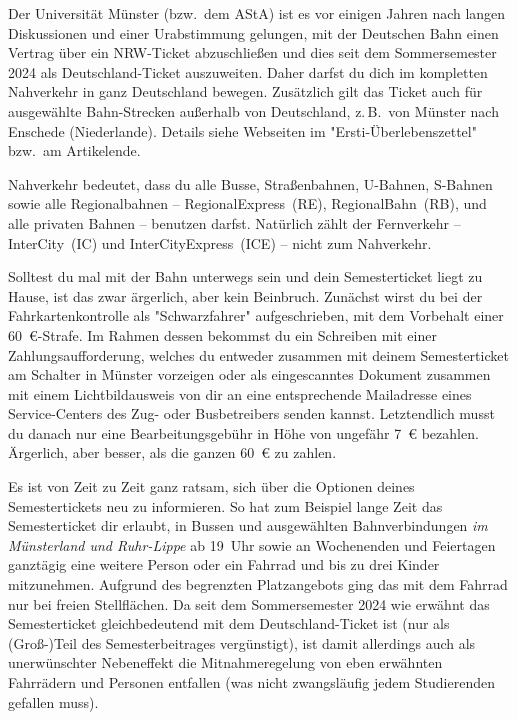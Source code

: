 \begin{multicols*}{2}
Der Universität Münster (bzw.\ dem AStA) ist es vor einigen Jahren nach langen Diskussionen und einer Urabstimmung gelungen, mit der Deutschen Bahn einen Vertrag über ein NRW-Ticket abzuschließen und dies seit dem Sommersemester 2024 als Deutschland-Ticket auszuweiten.
Daher darfst du dich im kompletten Nahverkehr in ganz Deutschland bewegen.
Zusätzlich gilt das Ticket auch für ausgewählte Bahn-Strecken außerhalb von Deutschland, z.\,B.\ von Münster nach Enschede (Niederlande). Details siehe Webseiten im "Ersti-Überlebenszettel" bzw.\ am Artikelende.

Nahverkehr bedeutet, dass du alle Busse, Straßenbahnen, U-Bahnen, S-Bahnen sowie alle Regionalbahnen -- RegionalExpress~(RE), RegionalBahn~(RB), und alle privaten Bahnen -- benutzen darfst.
Natürlich zählt der Fernverkehr -- InterCity~(IC) und InterCityExpress~(ICE) -- nicht zum Nahverkehr.

Solltest du mal mit der Bahn unterwegs sein und dein Semesterticket liegt zu Hause, ist das zwar ärgerlich, aber kein Beinbruch.
Zunächst wirst du bei der Fahrkartenkontrolle als "Schwarzfahrer" aufgeschrieben, mit dem Vorbehalt einer \SI{60}{\euro}-Strafe.
Im Rahmen dessen bekommst du ein Schreiben mit einer Zahlungsaufforderung, welches du entweder zusammen mit deinem Semesterticket am Schalter in Münster vorzeigen oder als eingescanntes Dokument zusammen mit einem Lichtbildausweis von dir an eine entsprechende Mailadresse eines Service-Centers des Zug- oder Busbetreibers senden kannst.  
Letztendlich musst du danach nur eine Bearbeitungsgebühr in Höhe von ungefähr \SI{7}{\euro} bezahlen. Ärgerlich, aber besser, als die ganzen \SI{60}{\euro} zu zahlen.

Es ist von Zeit zu Zeit ganz ratsam, sich über die Optionen deines Semestertickets neu zu informieren.
So hat zum Beispiel lange Zeit das Semesterticket dir erlaubt, in Bussen und ausgewählten Bahnverbindungen \emph{im Münsterland und Ruhr-Lippe} ab 19~Uhr sowie an Wochenenden und Feiertagen ganztägig eine weitere Person oder ein Fahrrad und bis zu drei Kinder mitzunehmen. Aufgrund des begrenzten Platzangebots ging das mit dem Fahrrad nur bei freien Stellflächen.
Da seit dem Sommersemester 2024 wie erwähnt das Semesterticket gleichbedeutend mit dem Deutschland-Ticket ist (nur als (Groß-)Teil des Semesterbeitrages vergünstigt), ist damit allerdings auch als unerwünschter Nebeneffekt die Mitnahmeregelung von eben erwähnten Fahrrädern und Personen entfallen (was nicht zwangsläufig jedem Studierenden gefallen muss). 



\end{multicols*}
